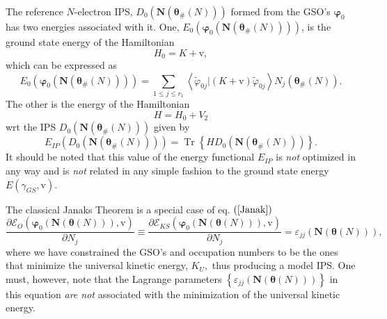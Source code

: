 \documentclass[aps,preprint]{revtex4}%
\begin{document}
The reference $N$-electron IPS, $D_{0}\left(  \boldsymbol{N}\left(
\boldsymbol{\theta}_{\#}\left(  N\right)  \right)  \right)  $ formed from the
GSO's $\boldsymbol{\varphi}_{0}$ has two energies associated with it. One,
$E_{0}\left(  \boldsymbol{\varphi}_{0}\left(  \boldsymbol{N}\left(
\boldsymbol{\theta}_{\#}\left(  N\right)  \right)  \right)  \right)  $, is the
ground state energy of the Hamiltonian%
\begin{equation}
H_{0}=K+\mathrm{v},
\end{equation}
which can be expressed as
\begin{equation}
E_{0}\left(  \boldsymbol{\varphi}_{0}\left(  \boldsymbol{N}\left(
\boldsymbol{\theta}_{\#}\left(  N\right)  \right)  \right)  \right)
=\sum_{1\leq j\leq r_{1}}\left\langle \tilde{\varphi}_{0j}\left\vert \left(
K+\mathrm{v}\right)  \right.  \tilde{\varphi}_{0j}\right\rangle N_{j}\left(
\boldsymbol{\theta}_{\#}\left(  N\right)  \right)  .
\end{equation}
The other is the energy of the Hamiltonian
\begin{equation}
H=H_{0}+V_{2}%
\end{equation}
wrt the IPS $D_{0}\left(  \boldsymbol{N}\left(  \boldsymbol{\theta}%
_{\#}\left(  N\right)  \right)  \right)  $ given by
\begin{equation}
E_{IP}\left(  D_{0}\left(  \boldsymbol{N}\left(  \boldsymbol{\theta}%
_{\#}\left(  N\right)  \right)  \right)  \right)  =\operatorname{Tr}\left\{
HD_{0}\left(  \boldsymbol{N}\left(  \boldsymbol{\theta}_{\#}\left(  N\right)
\right)  \right)  \right\}  .
\end{equation}
It should be noted that this value of the energy functional $E_{IP}$ is
\emph{not }optimized in any way and is \emph{not }related in any simple
fashion to the ground state energy $E\left(  \gamma_{GS}\boldsymbol{,}%
\mathrm{v}\right)  .$

The classical Janaks Theorem is a special case of eq. $\left(  \ref{Janak}%
\right)  $
\begin{equation}
\frac{\partial\mathcal{E}_{O}\left(  \boldsymbol{\varphi}_{0}\left(
\boldsymbol{N}\left(  \boldsymbol{\theta}\left(  N\right)  \right)  \right)
,\mathrm{v}\right)  }{\partial N_{j}}\equiv\frac{\partial\mathcal{E}%
_{KS}\left(  \boldsymbol{\varphi}_{0}\left(  \boldsymbol{N}\left(
\boldsymbol{\theta}\left(  N\right)  \right)  \right)  ,\mathrm{v}\right)
}{\partial N_{j}}=\varepsilon_{jj}\left(  \boldsymbol{N}\left(
\boldsymbol{\theta}\left(  N\right)  \right)  \right)  , \label{ClassJanak}%
\end{equation}
where we have constrained the GSO's and occupation numbers to be the ones that
minimize the universal kinetic energy, $K_{U},$ thus producing a model IPS.
One must, however, note that the Lagrange parameters $\left\{  \varepsilon
_{jj}\left(  \boldsymbol{N}\left(  \boldsymbol{\theta}\left(  N\right)
\right)  \right)  \right\}  $ in this equation \emph{are not }associated with
the minimization of the universal kinetic energy.\emph{ }
\end{document}
